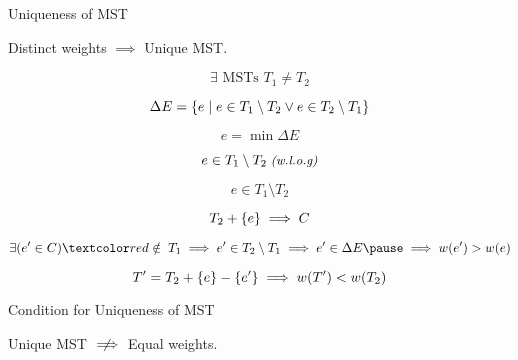 
\begin{frame}{}
  \centerline{}
\end{frame}

\begin{frame}{}
  \begin{exampleblock}{Uniqueness of MST }
    \centerline{Distinct weights $\implies$ Unique MST.}
  \end{exampleblock}

  \pause
  \vspace{0.50cm}
  \centerline{}

  \pause
  \[
    \exists \text{ MSTs } T_1 \neq T_2
  \]

  \pause
  \[
    \Delta E = \{e \mid e \in T_1 \setminus T_2 \lor e \in T_2 \setminus T_1\}
  \]

  \pause
  \[
    e = \min \Delta E
  \]

  \pause
  \[
    e \in T_1 \setminus T_2 \;\text{\small \it (w.l.o.g)}
  \]
\end{frame}

\begin{frame}{}
  \[
    e \in T_1 \setminus T_2
  \]


  \pause
  \vspace{-0.30cm}
  \[
    T_2 + \{e\} \implies C
  \]

  \pause
  \vspace{-0.30cm}
  \[
    \exists (e' \in C) \red{\;\notin\; T_1} \implies e' \in T_{2} \setminus T_{1} \implies e' \in \Delta E \pause \implies w(e') > w(e)
  \]

  \pause
  \vspace{-0.50cm}
  \[
    T' = T_{2} + \{e\} - \{e'\} \implies w(T') < w(T_{2})
  \]
\end{frame}

\begin{frame}{}
  \begin{exampleblock}{Condition for Uniqueness of MST }
    \centerline{Unique MST $\centernot\implies$ Equal weights.}
  \end{exampleblock}

  \pause
\end{frame}

